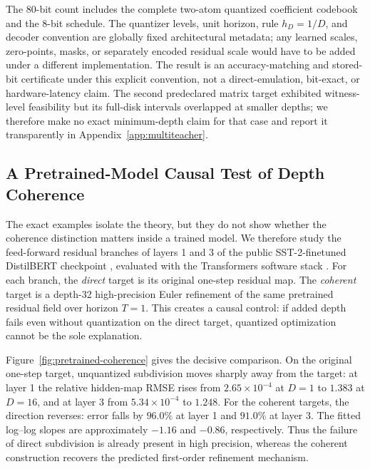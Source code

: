 \documentclass[twoside,11pt]{article}
\begin{document}
The 80-bit count includes the complete two-atom quantized coefficient codebook and the 8-bit schedule.  The quantizer levels, unit horizon, rule $h_D=1/D$, and decoder convention are globally fixed architectural metadata; any learned scales, zero-points, masks, or separately encoded residual scale would have to be added under a different implementation.  The result is an accuracy-matching and stored-bit certificate under this explicit convention, not a direct-emulation, bit-exact, or hardware-latency claim.  The second predeclared matrix target exhibited witness-level feasibility but its full-disk intervals overlapped at smaller depths; we therefore make no exact minimum-depth claim for that case and report it transparently in Appendix~\ref{app:multiteacher}.

\subsection{A Pretrained-Model Causal Test of Depth Coherence}
\label{sec:pretrained-causal}

The exact examples isolate the theory, but they do not show whether the coherence distinction matters inside a trained model.  We therefore study the feed-forward residual branches of layers 1 and 3 of the public SST-2-finetuned DistilBERT checkpoint \citep{SanhEtAl2019DistilBERT,WangEtAl2019GLUE,SocherEtAl2013SST,HuggingFaceDistilBERTSST2}, evaluated with the Transformers software stack \citep{WolfEtAl2020Transformers}.  For each branch, the \emph{direct} target is its original one-step residual map.  The \emph{coherent} target is a depth-32 high-precision Euler refinement of the same pretrained residual field over horizon $T=1$.  This creates a causal control: if added depth fails even without quantization on the direct target, quantized optimization cannot be the sole explanation.

Figure~\ref{fig:pretrained-coherence} gives the decisive comparison.  On the original one-step target, unquantized subdivision moves sharply away from the target: at layer 1 the relative hidden-map RMSE rises from $2.65\times10^{-4}$ at $D=1$ to $1.383$ at $D=16$, and at layer 3 from $5.34\times10^{-4}$ to $1.248$.  For the coherent targets, the direction reverses: error falls by $96.0\%$ at layer 1 and $91.0\%$ at layer 3.  The fitted log--log slopes are approximately $-1.16$ and $-0.86$, respectively.  Thus the failure of direct subdivision is already present in high precision, whereas the coherent construction recovers the predicted first-order refinement mechanism.
\end{document}
